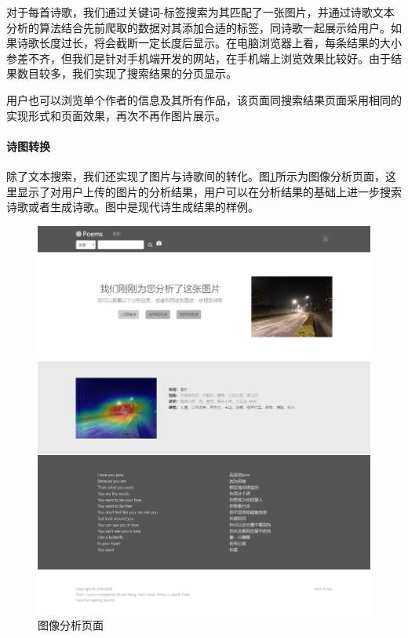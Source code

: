 \documentclass[a4paper, 10pt]{article}
\begin{document}
对于每首诗歌，我们通过关键词-标签搜索为其匹配了一张图片，并通过诗歌文本分析的算法结合先前爬取的数据对其添加合适的标签，同诗歌一起展示给用户。如果诗歌长度过长，将会截断一定长度后显示。在电脑浏览器上看，每条结果的大小参差不齐，但我们是针对手机端开发的网站，在手机端上浏览效果比较好。由于结果数目较多，我们实现了搜索结果的分页显示。

用户也可以浏览单个作者的信息及其所有作品，该页面同搜索结果页面采用相同的实现形式和页面效果，再次不再作图片展示。


\paragraph*{诗图转换} 除了文本搜索，我们还实现了图片与诗歌间的转化。图\ref{fig:demo_analyze}所示为图像分析页面，这里显示了对用户上传的图片的分析结果，用户可以在分析结果的基础上进一步搜索诗歌或者生成诗歌。图中是现代诗生成结果的样例。

\begin{figure}[H]
\centering
\includegraphics[scale=0.48]{fig/demo_analyze.png}
\caption{图像分析页面}
\label{fig:demo_analyze}
\end{figure}
\end{document}
